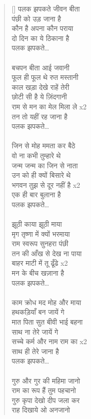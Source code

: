 \begin{verse}[\versewidth]\texthindi{ 
पलक झपकते जीवन बीता\\
पंछी को उड़ जाना है\\
कौन है अपना कौन पराया\\
दो दिन का ये ठिकाना है\\
पलक झपकते…\\
\\
बचपन बीता आई जवानी\\
फूल ही फूल थे रुत मस्तानी\\
काल खड़ा देखे राहें तेरी\\
छोटी सी है ये ज़िंदगानी\\
राम से मन का मेल मिला ले x2\\
तन तो यहीं रह जाना है\\
पलक झपकते…\\
\\
जिन से मोह ममता कर बैठे\\
वो ना कभी तुम्हारे थे\\
जन्म जन्म का जिन से नाता\\
उन को ही क्यों बिसारे थे\\
भगवन तुझ से दूर नहीं है x2\\
एक ही बार बुलाना है\\
पलक झपकते…\\
\\
झूठी काया झूठी माया\\
मृग तृष्णा में क्यों भरमाया\\
राम स्वरूप सुनहरा पंछी\\
तन की आँख से देख ना पाया\\
बाहर माटी में तू ढूँढे x2\\
मन के बीच खज़ाना है\\
पलक झपकते…\\
\\
काम क्रोध मद मोह और माया\\
हथकड़ियाँ बन जायें गे\\
मात पिता सुत बीवी भाई बहना\\
साथ ना तेरे जायें गे\\
सच्चे कर्म और नाम राम का x2\\
साथ ही तेरे जाना है\\
पलक झपकते…\\
\\
गुरु और गुर की महिमा जानो\\
राम का रूप हैं तुम पहचानो\\
गुरु कृपा देखो दीप जला कर\\
राह दिखाये ओ अनजानो\\
}
\end{verse}
